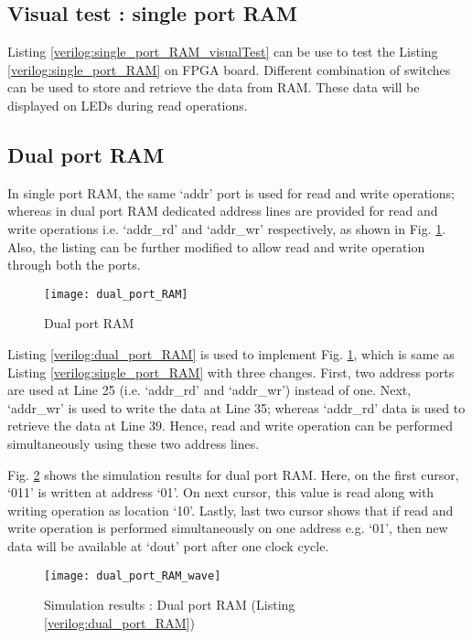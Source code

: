 

\subsection{Visual test : single port RAM}
Listing \ref{verilog:single_port_RAM_visualTest} can be use to test the Listing \ref{verilog:single_port_RAM} on FPGA board. Different combination of switches can be used to store and retrieve the data from RAM. These data will be displayed on LEDs during read operations. 



\subsection{Dual port RAM}
In single port RAM, the same `addr' port is used for read and write operations; whereas in dual port RAM dedicated address lines are provided for read and write operations i.e. `addr\_rd' and `addr\_wr' respectively, as shown in Fig. \ref{fig:dual_port_RAM}. Also, the listing can be further modified to allow read and write operation through both the ports. 

\begin{figure}[!h]
	\centering
	\texttt{[image: dual\_port\_RAM]}
	\caption{Dual port RAM}
	\label{fig:dual_port_RAM}
\end{figure}

Listing \ref{verilog:dual_port_RAM} is used to implement Fig. \ref{fig:dual_port_RAM}, which is same as Listing \ref{verilog:single_port_RAM} with three changes. First, two address ports are used at Line 25 (i.e. `addr\_rd' and `addr\_wr') instead of one. Next, `addr\_wr' is used to write the data at Line 35; whereas `addr\_rd' data is used to retrieve the data at Line 39. Hence, read and write operation can be performed simultaneously using these two address lines.

Fig. \ref{fig:dual_port_RAM_wave} shows the simulation results for dual port RAM. Here, on the first cursor, `011' is written at address `01'. On next cursor, this value is read along with writing operation as location `10'. Lastly, last two cursor shows that if read and write operation is performed simultaneously on one address e.g. `01', then new data will be available at `dout' port after one clock cycle. 
\begin{figure}[!h]
	\centering
	\texttt{[image: dual\_port\_RAM\_wave]}
	\caption{Simulation results : Dual port RAM (Listing \ref{verilog:dual_port_RAM})}
	\label{fig:dual_port_RAM_wave}
\end{figure}

